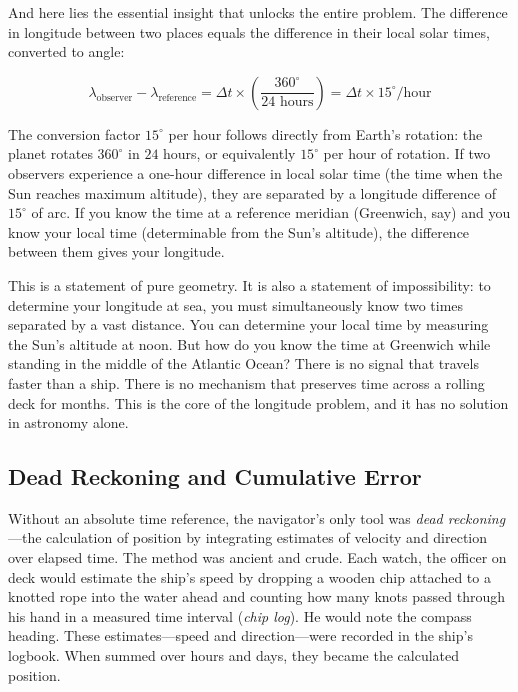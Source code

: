 And here lies the essential insight that unlocks the entire problem. The difference in longitude between two places equals the difference in their local solar times, converted to angle:

\begin{equation}
\lambda_{\text{observer}} - \lambda_{\text{reference}} = \Delta t \times \left(\frac{360^{\circ}}{24 \text{ hours}}\right) = \Delta t \times 15^{\circ}/\text{hour}
\end{equation}

The conversion factor $15^{\circ}$ per hour follows directly from Earth's rotation: the planet rotates $360^{\circ}$ in $24$ hours, or equivalently $15^{\circ}$ per hour of rotation. If two observers experience a one-hour difference in local solar time (the time when the Sun reaches maximum altitude), they are separated by a longitude difference of $15^{\circ}$ of arc. If you know the time at a reference meridian (Greenwich, say) and you know your local time (determinable from the Sun's altitude), the difference between them gives your longitude.

This is a statement of pure geometry. It is also a statement of impossibility: to determine your longitude at sea, you must simultaneously know two times separated by a vast distance. You can determine your local time by measuring the Sun's altitude at noon. But how do you know the time at Greenwich while standing in the middle of the Atlantic Ocean? There is no signal that travels faster than a ship. There is no mechanism that preserves time across a rolling deck for months. This is the core of the longitude problem, and it has no solution in astronomy alone.

\subsection{Dead Reckoning and Cumulative Error}

Without an absolute time reference, the navigator's only tool was \emph{dead reckoning}---the calculation of position by integrating estimates of velocity and direction over elapsed time. The method was ancient and crude. Each watch, the officer on deck would estimate the ship's speed by dropping a wooden chip attached to a knotted rope into the water ahead and counting how many knots passed through his hand in a measured time interval (\emph{chip log}). He would note the compass heading. These estimates---speed and direction---were recorded in the ship's logbook. When summed over hours and days, they became the calculated position.


